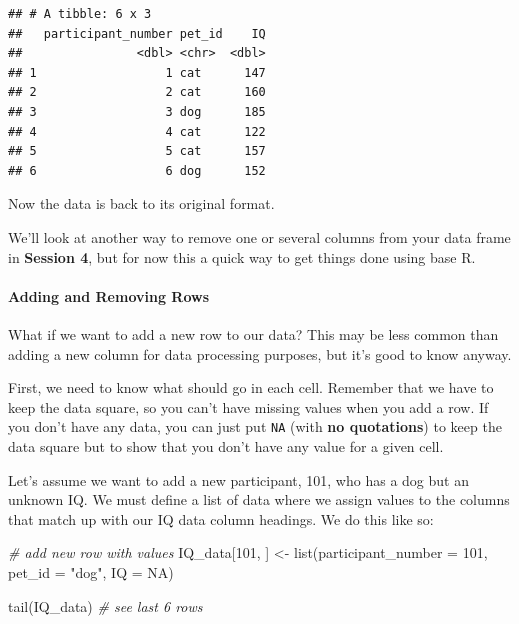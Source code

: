 \documentclass[
]{book}
\newenvironment{Shaded}{\begin{snugshade}}{\end{snugshade}}
\newcommand{\AttributeTok}[1]{\textcolor[rgb]{0.77,0.63,0.00}{#1}}
\newcommand{\CommentTok}[1]{\textcolor[rgb]{0.56,0.35,0.01}{\textit{#1}}}
\newcommand{\ConstantTok}[1]{\textcolor[rgb]{0.00,0.00,0.00}{#1}}
\newcommand{\DecValTok}[1]{\textcolor[rgb]{0.00,0.00,0.81}{#1}}
\newcommand{\FunctionTok}[1]{\textcolor[rgb]{0.00,0.00,0.00}{#1}}
\newcommand{\NormalTok}[1]{#1}
\newcommand{\OtherTok}[1]{\textcolor[rgb]{0.56,0.35,0.01}{#1}}
\newcommand{\SpecialCharTok}[1]{\textcolor[rgb]{0.00,0.00,0.00}{#1}}
\newcommand{\StringTok}[1]{\textcolor[rgb]{0.31,0.60,0.02}{#1}}
\begin{document}
\begin{Shaded}
\end{Shaded}

\begin{verbatim}
## # A tibble: 6 x 3
##   participant_number pet_id    IQ
##                <dbl> <chr>  <dbl>
## 1                  1 cat      147
## 2                  2 cat      160
## 3                  3 dog      185
## 4                  4 cat      122
## 5                  5 cat      157
## 6                  6 dog      152
\end{verbatim}

Now the data is back to its original format.

We'll look at another way to remove one or several columns from your data frame in \textbf{Session 4}, but for now this a quick way to get things done using base R.

\hypertarget{adding-and-removing-rows}{%
\paragraph{Adding and Removing Rows}\label{adding-and-removing-rows}}

What if we want to add a new row to our data? This may be less common than adding a new column for data processing purposes, but it's good to know anyway.

First, we need to know what should go in each cell. Remember that we have to keep the data square, so you can't have missing values when you add a row. If you don't have any data, you can just put \texttt{NA} (with \textbf{no quotations}) to keep the data square but to show that you don't have any value for a given cell.

Let's assume we want to add a new participant, 101, who has a dog but an unknown IQ. We must define a list of data where we assign values to the columns that match up with our IQ data column headings. We do this like so:

\begin{Shaded}
\begin{Highlighting}[]
\CommentTok{\# add new row with values}
\NormalTok{IQ\_data[}\DecValTok{101}\NormalTok{, ] }\OtherTok{\textless{}{-}} \FunctionTok{list}\NormalTok{(}\AttributeTok{participant\_number =} \DecValTok{101}\NormalTok{, }\AttributeTok{pet\_id =} \StringTok{"dog"}\NormalTok{, }\AttributeTok{IQ =} \ConstantTok{NA}\NormalTok{) }

\FunctionTok{tail}\NormalTok{(IQ\_data) }\CommentTok{\# see last 6 rows}
\end{Highlighting}
\end{Shaded}
\end{document}
